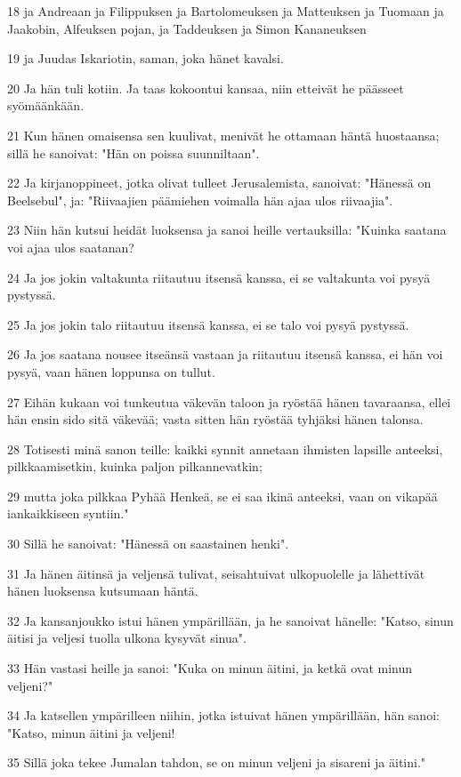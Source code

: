 \par 18 ja Andreaan ja Filippuksen ja Bartolomeuksen ja Matteuksen ja Tuomaan ja Jaakobin, Alfeuksen pojan, ja Taddeuksen ja Simon Kananeuksen
\par 19 ja Juudas Iskariotin, saman, joka hänet kavalsi.
\par 20 Ja hän tuli kotiin. Ja taas kokoontui kansaa, niin etteivät he päässeet syömäänkään.
\par 21 Kun hänen omaisensa sen kuulivat, menivät he ottamaan häntä huostaansa; sillä he sanoivat: "Hän on poissa suunniltaan".
\par 22 Ja kirjanoppineet, jotka olivat tulleet Jerusalemista, sanoivat: "Hänessä on Beelsebul", ja: "Riivaajien päämiehen voimalla hän ajaa ulos riivaajia".
\par 23 Niin hän kutsui heidät luoksensa ja sanoi heille vertauksilla: "Kuinka saatana voi ajaa ulos saatanan?
\par 24 Ja jos jokin valtakunta riitautuu itsensä kanssa, ei se valtakunta voi pysyä pystyssä.
\par 25 Ja jos jokin talo riitautuu itsensä kanssa, ei se talo voi pysyä pystyssä.
\par 26 Ja jos saatana nousee itseänsä vastaan ja riitautuu itsensä kanssa, ei hän voi pysyä, vaan hänen loppunsa on tullut.
\par 27 Eihän kukaan voi tunkeutua väkevän taloon ja ryöstää hänen tavaraansa, ellei hän ensin sido sitä väkevää; vasta sitten hän ryöstää tyhjäksi hänen talonsa.
\par 28 Totisesti minä sanon teille: kaikki synnit annetaan ihmisten lapsille anteeksi, pilkkaamisetkin, kuinka paljon pilkannevatkin;
\par 29 mutta joka pilkkaa Pyhää Henkeä, se ei saa ikinä anteeksi, vaan on vikapää iankaikkiseen syntiin."
\par 30 Sillä he sanoivat: "Hänessä on saastainen henki".
\par 31 Ja hänen äitinsä ja veljensä tulivat, seisahtuivat ulkopuolelle ja lähettivät hänen luoksensa kutsumaan häntä.
\par 32 Ja kansanjoukko istui hänen ympärillään, ja he sanoivat hänelle: "Katso, sinun äitisi ja veljesi tuolla ulkona kysyvät sinua".
\par 33 Hän vastasi heille ja sanoi: "Kuka on minun äitini, ja ketkä ovat minun veljeni?"
\par 34 Ja katsellen ympärilleen niihin, jotka istuivat hänen ympärillään, hän sanoi: "Katso, minun äitini ja veljeni!
\par 35 Sillä joka tekee Jumalan tahdon, se on minun veljeni ja sisareni ja äitini."

